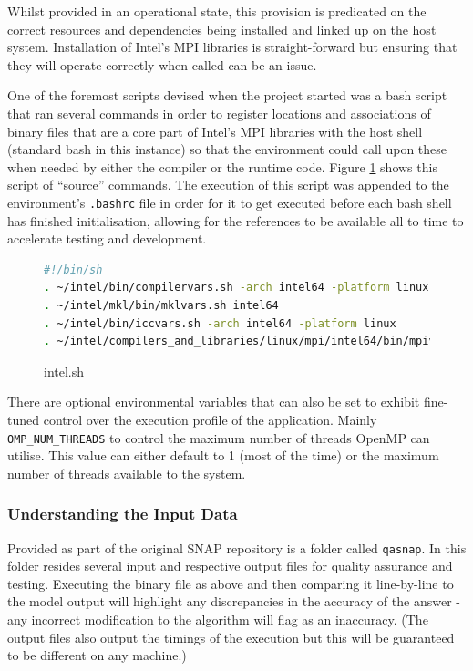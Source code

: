 \documentclass[conference]{IEEEtran}
\begin{document}
Whilst provided in an operational state, this provision is predicated on the correct resources and dependencies being installed and linked up on the host system. Installation of Intel's MPI libraries is straight-forward but ensuring that they will operate correctly when called can be an issue.

One of the foremost scripts devised when the project started was a bash script that ran several commands in order to register locations and associations of binary files that are a core part of Intel's MPI libraries with the host shell (standard bash in this instance) so that the environment could call upon these when needed by either the compiler or the runtime code. Figure \ref{fig:source_list} shows this script of ``source'' commands. The execution of this script was appended to the environment's \texttt{.bashrc} file in order for it to get executed before each bash shell has finished initialisation, allowing for the references to be available all to time to accelerate testing and development.

\begin{figure}[h]
    \centering
    \begin{lstlisting}[language=bash, breaklines]
#!/bin/sh
. ~/intel/bin/compilervars.sh -arch intel64 -platform linux
. ~/intel/mkl/bin/mklvars.sh intel64
. ~/intel/bin/iccvars.sh -arch intel64 -platform linux
. ~/intel/compilers_and_libraries/linux/mpi/intel64/bin/mpivars.sh 
    \end{lstlisting}
    \caption{intel.sh}
    \label{fig:source_list}
\end{figure}

There are optional environmental variables that can also be set to exhibit fine-tuned control over the execution profile of the application. Mainly \texttt{OMP\_NUM\_THREADS} to control the maximum number of threads OpenMP can utilise. This value can either default to 1 (most of the time) or the maximum number of threads available to the system.


\subsubsection{Understanding the Input Data}

Provided as part of the original SNAP repository is a folder called \texttt{qasnap}. In this folder resides several input and respective output files for quality assurance and testing. Executing the binary file as above and then comparing it line-by-line to the model output will highlight any discrepancies in the accuracy of the answer - any incorrect modification to the algorithm will flag as an inaccuracy. (The output files also output the timings of the execution but this will be guaranteed to be different on any machine.)
\end{document}
